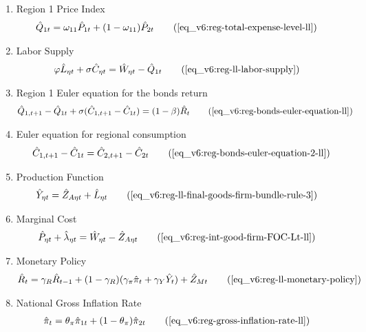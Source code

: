 \documentclass[../thesis.tex]{subfiles}
\begin{document}
{\begin{itemize}
\begin{enumerate}
		\item Region 1 Price Index
		\begin{align}
			\hat{Q}_{1t} &= \omega_{11} \hat{P}_{1 t} + (1 -\omega_{11}) \hat{P}_{2 t} \tag{\ref{eq_v6:reg-total-expense-level-ll}}
		\end{align}
		
		\item Labor Supply
		\begin{alignat}{2}
			\varphi \hat{L}_{\eta t} + \sigma \hat{C}_{\eta t} &= \hat{W}_{\eta t} - \hat{Q}_{1t} \tag{\ref{eq_v6:reg-ll-labor-supply}}
		\end{alignat}
		
		\item Region 1 Euler equation for the bonds return
		\begin{align}
			\hat{Q}_{1, t+1} - \hat{Q}_{1t} + \sigma (\hat{C}_{1, t+1} - \hat{C}_{1t}) &= (1 - \beta) \hat{R}_{t} \tag{\ref{eq_v6:reg-bonds-euler-equation-ll}}
		\end{align}
		
		\item Euler equation for regional consumption
		\begin{align}
			\hat{C}_{1, t+1} - \hat{C}_{1t} = \hat{C}_{2, t+1} - \hat{C}_{2t} \tag{\ref{eq_v6:reg-bonds-euler-equation-2-ll}}
		\end{align}
		
		\item Production Function
		\begin{align}
			\hat{Y}_{\eta t} &= \hat{Z}_{A\eta t} + \hat{L}_{\eta t} \tag{\ref{eq_v6:reg-ll-final-goods-firm-bundle-rule-3}}
		\end{align}
		
		\item Marginal Cost
		\begin{align}
			\hat{P}_{\eta t} + \hat{\lambda}_{\eta t} &= \hat{W}_{\eta t} - \hat{Z}_{A\eta t} \tag{\ref{eq_v6:reg-int-good-firm-FOC-Lt-ll}}
		\end{align}
		
		\item Monetary Policy
		\begin{align}
			\hat{R}_t = \gamma_{R} \hat{R}_{t-1} + (1-\gamma_{R})(\gamma_{\pi} \hat{\pi}_t + \gamma_{Y} \hat{Y}_t) + \hat{Z}_{Mt} \tag{\ref{eq_v6:reg-ll-monetary-policy}}
		\end{align}
		
		\item National Gross Inflation Rate
		\begin{align}
			\hat{\pi}_{t} &= \theta_{\pi} \hat{\pi}_{1t} + (1 - \theta_{\pi}) \hat{\pi}_{2t} \tag{\ref{eq_v6:reg-gross-inflation-rate-ll}}
		\end{align}
		

\end{enumerate}
\end{itemize}}
\end{document}
